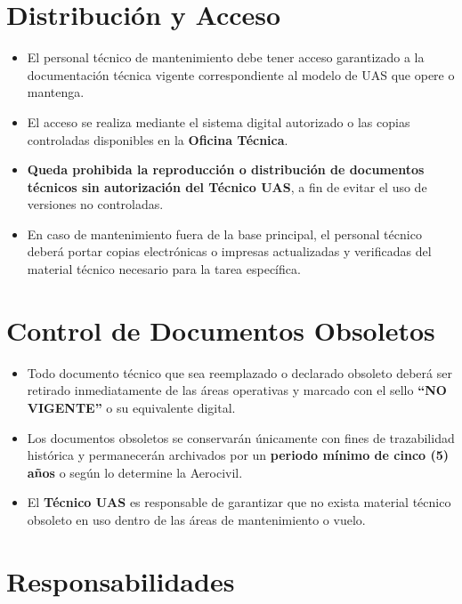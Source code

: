 \section{Distribución y Acceso}
\begin{itemize}
    \item El personal técnico de mantenimiento debe tener acceso garantizado a la documentación técnica vigente correspondiente al modelo de UAS que opere o mantenga.

    \item El acceso se realiza mediante el sistema digital autorizado o las copias controladas disponibles en la \textbf{Oficina Técnica}.

    \item \textbf{Queda prohibida la reproducción o distribución de documentos técnicos sin autorización del Técnico UAS}, a fin de evitar el uso de versiones no controladas.

    \item En caso de mantenimiento fuera de la base principal, el personal técnico deberá portar copias electrónicas o impresas actualizadas y verificadas del material técnico necesario para la tarea específica.
\end{itemize}

\section{Control de Documentos Obsoletos}
\begin{itemize}
    \item Todo documento técnico que sea reemplazado o declarado obsoleto deberá ser retirado inmediatamente de las áreas operativas y marcado con el sello \textbf{“NO VIGENTE”} o su equivalente digital.

    \item Los documentos obsoletos se conservarán únicamente con fines de trazabilidad histórica y permanecerán archivados por un \textbf{periodo mínimo de cinco (5) años} o según lo determine la Aerocivil.

    \item El \textbf{Técnico UAS} es responsable de garantizar que no exista material técnico obsoleto en uso dentro de las áreas de mantenimiento o vuelo.
\end{itemize}

\section{Responsabilidades}

